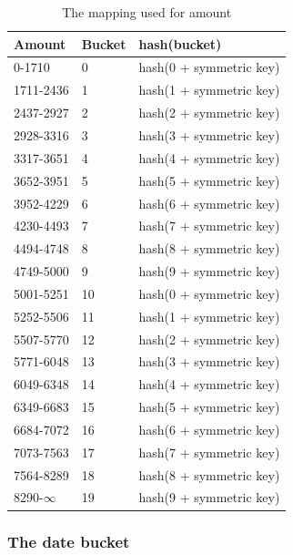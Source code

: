 \documentclass[a4paper]{article}
\begin{document}
        \begin{table}[t!]
        \begin{tabular}{| l | l | l |} \hline
            \textbf{Amount} & \textbf{Bucket} & \textbf{hash(bucket)} \\ \hline
            0-1710 & 0 & hash(0 + symmetric key) \\ \hline
            1711-2436 & 1 & hash(1 + symmetric key) \\ \hline
            2437-2927 & 2 & hash(2 + symmetric key) \\ \hline
            2928-3316 & 3 & hash(3 + symmetric key) \\ \hline
            3317-3651 & 4 & hash(4 + symmetric key) \\ \hline
            3652-3951 & 5 & hash(5 + symmetric key) \\ \hline
            3952-4229 & 6 & hash(6 + symmetric key) \\ \hline
            4230-4493 & 7 & hash(7 + symmetric key) \\ \hline
            4494-4748 & 8 & hash(8 + symmetric key) \\ \hline
            4749-5000 & 9 & hash(9 + symmetric key) \\ \hline
            5001-5251 & 10 & hash(0 + symmetric key) \\ \hline
            5252-5506 & 11 & hash(1 + symmetric key) \\ \hline
            5507-5770 & 12 & hash(2 + symmetric key) \\ \hline
            5771-6048 & 13 & hash(3 + symmetric key) \\ \hline
            6049-6348 & 14 & hash(4 + symmetric key) \\ \hline
            6349-6683 & 15 & hash(5 + symmetric key) \\ \hline
            6684-7072 & 16 & hash(6 + symmetric key) \\ \hline
            7073-7563 & 17 & hash(7 + symmetric key) \\ \hline
            7564-8289 & 18 & hash(8 + symmetric key) \\ \hline
            8290-$\infty$ & 19 & hash(9 + symmetric key) \\ \hline
        \end{tabular}
        \caption{The mapping used for amount}\label{tab:amountbucket}
        \end{table}
        
        \subsubsection{The date bucket}\label{sec:bucketdate}
        
\end{document}
